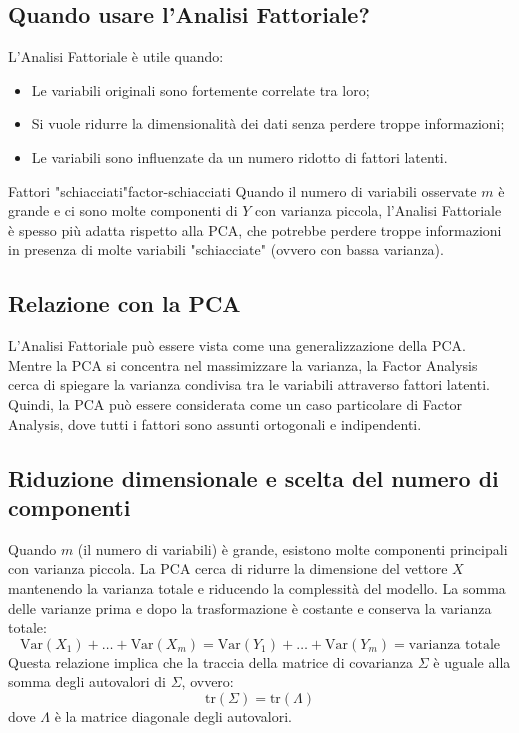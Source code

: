 \subsection{Quando usare l'Analisi Fattoriale?}

L'Analisi Fattoriale è utile quando:
\begin{itemize}
  \item Le variabili originali sono fortemente correlate tra loro;
  \item Si vuole ridurre la dimensionalità dei dati senza perdere troppe informazioni;
  \item Le variabili sono influenzate da un numero ridotto di fattori latenti.
\end{itemize}

\begin{nota}{Fattori "schiacciati"}{factor-schiacciati}
Quando il numero di variabili osservate \( m \) è grande e ci sono molte componenti di \( Y \) con varianza piccola, l'Analisi Fattoriale è spesso più adatta rispetto alla PCA, che potrebbe perdere troppe informazioni in presenza di molte variabili "schiacciate" (ovvero con bassa varianza).
\end{nota}

\subsection{Relazione con la PCA}

L'Analisi Fattoriale può essere vista come una generalizzazione della PCA. Mentre la PCA si concentra nel massimizzare la varianza, la Factor Analysis cerca di spiegare la varianza condivisa tra le variabili attraverso fattori latenti. Quindi, la PCA può essere considerata come un caso particolare di Factor Analysis, dove tutti i fattori sono assunti ortogonali e indipendenti.

\subsection{Riduzione dimensionale e scelta del numero di componenti}

Quando \( m \) (il numero di variabili) è grande, esistono molte componenti principali con varianza piccola. La PCA cerca di ridurre la dimensione del vettore \( X \) mantenendo la varianza totale e riducendo la complessità del modello. La somma delle varianze prima e dopo la trasformazione è costante e conserva la varianza totale:
\[
\text{Var}(X_1) + \dots + \text{Var}(X_m) = \text{Var}(Y_1) + \dots + \text{Var}(Y_m) = \text{varianza totale}
\]
Questa relazione implica che la traccia della matrice di covarianza \( \Sigma \) è uguale alla somma degli autovalori di \( \Sigma \), ovvero:
\[
\text{tr}(\Sigma) = \text{tr}(\Lambda)
\]
dove \( \Lambda \) è la matrice diagonale degli autovalori.

